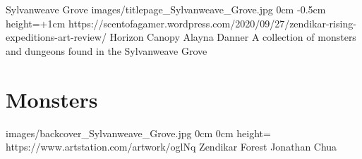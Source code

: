 \documentclass[letterpaper,openany,twoside,twocolumn]{book}
\begin{document}
	\bookTitlePage
		{Sylvanweave Grove}
		{images/titlepage_Sylvanweave_Grove.jpg}
		{0cm}
		{-0.5cm}
		{height=\paperheight+1cm}
		{https://scentofagamer.wordpress.com/2020/09/27/zendikar-rising-expeditions-art-review/}
		{Horizon Canopy}
		{Alayna Danner}
		{A collection of monsters and dungeons found in the Sylvanweave Grove}
	
	\tableofcontents
	
	\mainmatter
	
	\MonsterSheetGeometry
	\part{Monsters}
	
	
	\bookLastPage
		{images/backcover_Sylvanweave_Grove.jpg}
		{0cm}
		{0cm}
		{height=\paperheight}
		{https://www.artstation.com/artwork/oglNq}
		{Zendikar Forest}
		{Jonathan Chua}
		{}
\end{document}
